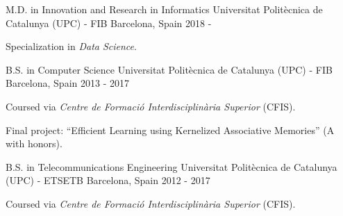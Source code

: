 
\begin{cventries}


\cventry
  {M.D. in Innovation and Research in Informatics} %
  {Universitat Polit\`ecnica de Catalunya (UPC) - FIB} %
  {Barcelona, Spain} %
  {2018 - } %
  {
    \begin{cvitems} %
      \item {Specialization in \textit{Data Science}.}
    \end{cvitems}
  }

\cventry
  {B.S. in Computer Science} %
  {Universitat Polit\`ecnica de Catalunya (UPC) - FIB} %
  {Barcelona, Spain} %
  {2013 - 2017} %
  {
    \begin{cvitems} %
      \item {Coursed via \textit{Centre de Formaci\'o Interdisciplin\`aria Superior} (CFIS).}
      \item {Final project: ``Efficient Learning using Kernelized Associative Memories'' (A with honors).}
    \end{cvitems}
  }

  \cventry
    {B.S. in Telecommunications Engineering} %
    {Universitat Polit\`ecnica de Catalunya (UPC) - ETSETB} %
    {Barcelona, Spain} %
    {2012 - 2017} %
    {
      \begin{cvitems} %
        \item {Coursed via \textit{Centre de Formaci\'o Interdisciplin\`aria Superior} (CFIS).}
      \end{cvitems}
    }

\end{cventries}
